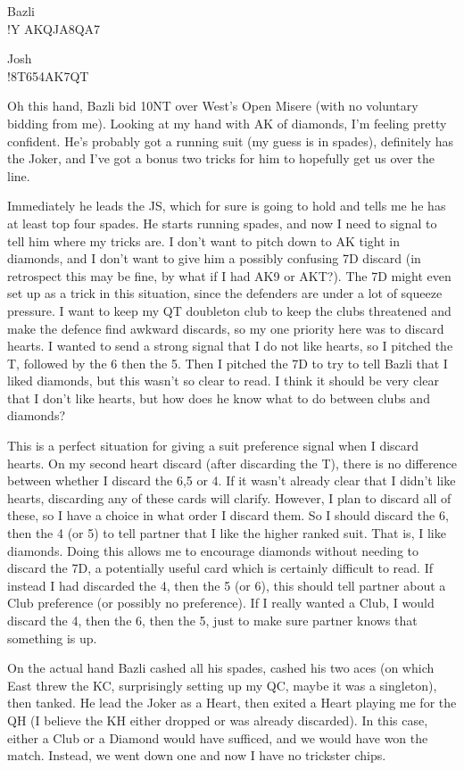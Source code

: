 \documentclass[a4paper]{JoshCards}
\begin{document}
\begin{center}
Bazli\\
\hand*!{Y AKQJ}{A8}{Q}{A7}
    
Josh\\
\hand*!{8}{T654}{AK7}{QT}
\end{center}

Oh this hand, Bazli bid 10NT over West's Open Misere (with no voluntary bidding from me). Looking at my hand with AK of diamonds, I'm feeling pretty confident. He's probably got a running suit (my guess is in spades), definitely has the Joker, and I've got a bonus two tricks for him to hopefully get us over the line.

Immediately he leads the JS, which for sure is going to hold and tells me he has at least top four spades. He starts running spades, and now I need to signal to tell him where my tricks are. I don't want to pitch down to AK tight in diamonds, and I don't want to give him a possibly confusing 7D discard (in retrospect this may be fine, by what if I had AK9 or AKT?). The 7D might even set up as a trick in this situation, since the defenders are under a lot of squeeze pressure. I want to keep my QT doubleton club to keep the clubs threatened and make the defence find awkward discards, so my one priority here was to discard hearts. I wanted to send a strong signal that I do not like hearts, so I pitched the T, followed by the 6 then the 5. Then I pitched the 7D to try to tell Bazli that I liked diamonds, but this wasn't so clear to read. I think it should be very clear that I don't like hearts, but how does he know what to do between clubs and diamonds?

This is a perfect situation for giving a suit preference signal when I discard hearts. On my second heart discard (after discarding the T), there is no difference between whether I discard the 6,5 or 4. If it wasn't already clear that I didn't like hearts, discarding any of these cards will clarify. However, I plan to discard all of these, so I have a choice in what order I discard them. So I should discard the 6, then the 4 (or 5) to tell partner that I like the higher ranked suit. That is, I like diamonds. Doing this allows me to encourage diamonds without needing to discard the 7D, a potentially useful card which is certainly difficult to read. If instead I had discarded the 4, then the 5 (or 6), this should tell partner about a Club preference (or possibly no preference). If I really wanted a Club, I would discard the 4, then the 6, then the 5, just to make sure partner knows that something is up.

On the actual hand Bazli cashed all his spades, cashed his two aces (on which East threw the KC, surprisingly setting up my QC, maybe it was a singleton), then tanked. He lead the Joker as a Heart, then exited a Heart playing me for the QH (I believe the KH either dropped or was already discarded). In this case, either a Club or a Diamond would have sufficed, and we would have won the match. Instead, we went down one and now I have no trickster chips.
\end{document}
